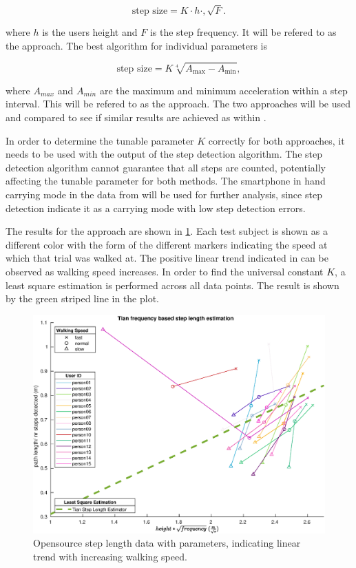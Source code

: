 \begin{equation}
	\label{eq:Tian2016_sle2}
	\text{step size} = K \cdot h \cdot, \sqrt{F}.
\end{equation}


 where $h$ is the users height and $F$ is the step frequency. It will be refered to as the \citet{Tian2016} approach. The best algorithm for individual parameters is 
 
 \begin{equation}
 	\text{step size} =K \sqrt[4]{A_{\max }-A_{\min }},
 	\label{eq:weinberg_stepsize2}
 \end{equation}
 
 where $A_{max}$ and $A_{min}$ are the maximum and minimum acceleration within a step interval. This will be refered to as the \citet{Weinberg2002} approach. The two approaches will be used and compared to see if similar results are achieved as within \cite{Vezocnik2019}.

In order to determine the tunable parameter $K$ correctly for both approaches, it needs to be used with the output of the step detection algorithm. The step detection algorithm cannot guarantee that all steps are counted, potentially affecting the tunable parameter for both methods. 
The smartphone in hand carrying mode in the data from \cite{Vezocnik2019} will be used for further analysis, since step detection indicate it as a carrying mode with low step detection errors. \par

The results for the \citet{Tian2016} approach are shown in \cref{fig:step_length_tian}. Each test subject is shown as a different color with the form of the different markers indicating the speed at which that trial was walked at. The positive linear trend indicated in \cite{Tian2016} can be observed as walking speed increases. In order to find the universal constant $K$, a least square estimation is performed across all data points. The result is shown by the green striped line in the plot. 

	\begin{figure}[H]
	\centering
	\includegraphics[width=0.8\linewidth]{images/20201113_1634_tian}
	\caption{Opensource step length data with \citet{Tian2016} parameters, indicating linear trend with increasing walking speed.}
	\label{fig:step_length_tian}
	\end{figure}
	
